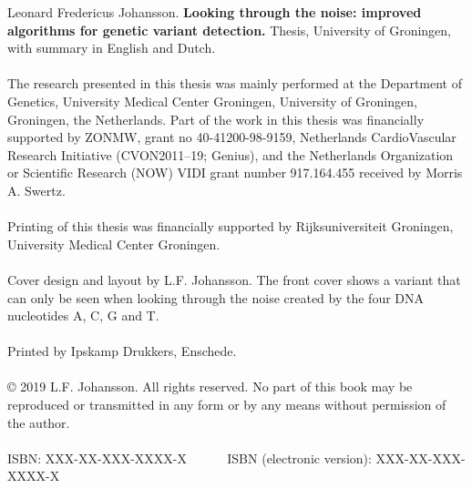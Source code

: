 {\small
	\noindent
	Leonard Fredericus Johansson. \textbf{Looking through the noise: improved algorithms for genetic variant detection.} Thesis, University of Groningen, with summary in English and Dutch.
	\\~\\
	The research presented in this thesis was mainly performed at the Department of Genetics, University Medical Center Groningen, University of Groningen, Groningen, the Netherlands. Part of the work in this thesis was financially supported by ZONMW, grant no 40-41200-98-9159, Netherlands CardioVascular Research Initiative (CVON2011–19; Genius), and the Netherlands Organization or Scientific Research (NOW) VIDI grant number 917.164.455 received by Morris A. Swertz. 
	\\~\\
	Printing of this thesis was financially supported by Rijksuniversiteit Groningen, University Medical Center Groningen. 
	\\~\\
	Cover design and layout by L.F. Johansson.
	The front cover shows a variant that can only be seen when looking through the noise created by the four DNA nucleotides A, C, G and T. 
	\\~\\
	Printed by Ipskamp Drukkers, Enschede.\\
	\\
	© 2019 L.F. Johansson. All rights reserved. No part of this book may be reproduced or transmitted in any form or by any means without permission of the author.\\
	\\
	ISBN: XXX-XX-XXX-XXXX-X \mbox{~~~~~} ISBN (electronic version): XXX-XX-XXX-XXXX-X
}

